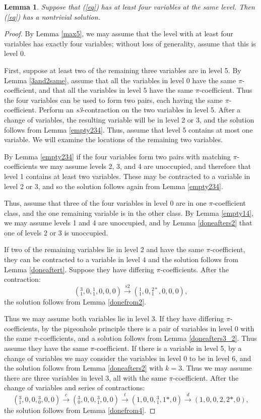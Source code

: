 \documentclass[draft]{publmathdeb}
\newtheorem{lemma}{Lemma}
\begin{document}
\begin{lemma}\label{max4}
Suppose that (\ref{eq}) has at least four variables at the same level.  Then (\ref{eq}) has a nontrivial solution.
\end{lemma}
\begin{proof} By Lemma \ref{max5}, we may assume that the level with at least four variables has exactly four variables; without loss of generality, assume that this is level 0.

First, suppose at least two of the remaining three variables are in level 5.  By Lemma \ref{3and2same}, assume that all the variables in level 0 have the same $\pi$-coefficient, and that all the variables in level 5 have the same $\pi$-coefficient.  Thus the four variables can be used to form two pairs, each having the same $\pi$-coefficient.  Perform an \textit{s3}-contraction on the two variables in level 5.  After a change of variables, the resulting variable will be in level 2 or 3, and the solution follows from Lemma \ref{empty234}.  Thus, assume that level 5 contains at most one variable.  We will examine the locations of the remaining two variables.

By Lemma \ref{empty234} if the four variables form two pairs with matching $\pi$-coefficients we may assume levels 2, 3, and 4 are unoccupied, and therefore that level 1 contains at least two variables.  These may be contracted to a variable in level 2 or 3, and so the solution follows again from Lemma \ref{empty234}.

Thus, assume that three of the four variables in level 0 are in one $\pi$-coefficient class, and the one remaining variable is in the other class.  By Lemma \ref{empty14}, we may assume levels 1 and 4 are unoccupied, and by Lemma \ref{doneafters2} that one of levels 2 or 3 is unoccupied.

If two of the remaining variables lie in level 2 and have the same $\pi$-coefficient, they can be contracted to a variable in level 4 and the solution follows from Lemma \ref{doneaftert}.  Suppose they have differing $\pi$-coefficients.  After the contraction: 
$$(^{3}_{1},0,{}^{1}_{1},0,0,0) \xrightarrow{s2}
({}^{1}_{1},0,{}^{2*}_{1},0,0,0),$$
the solution follows from Lemma \ref{donefrom2}.

Thus we may assume both variables lie in level 3.  If they have differing $\pi$-coefficients, by the pigeonhole principle there is a pair of variables in level 0 with the same $\pi$-coefficients, and a solution follows from Lemma \ref{doneafters3_2}.  Thus assume they have the same $\pi$-coefficient.  If there is a variable in level 5, by a change of variables we may consider the variables in level 0 to be in level 6, and the solution follows from Lemma \ref{doneafters2} with $k=3$.  Thus we may assume there are three variables in level 3, all with the same $\pi$-coefficient.  After the change of variables and series of contractions:
$$({}^{3}_{1},0,0,{}^{3}_{0},0,0) \xrightarrow{c} ({}^{3}_{0},0,0,{}^{3}_{1},0,0) \xrightarrow{t} (1,0,0,{}^{3}_{1},1*,0) \xrightarrow{d} (1,0,0,2,2*,0),$$
the solution follows from Lemma \ref{donefrom4}.
\end{proof}
\end{document}
